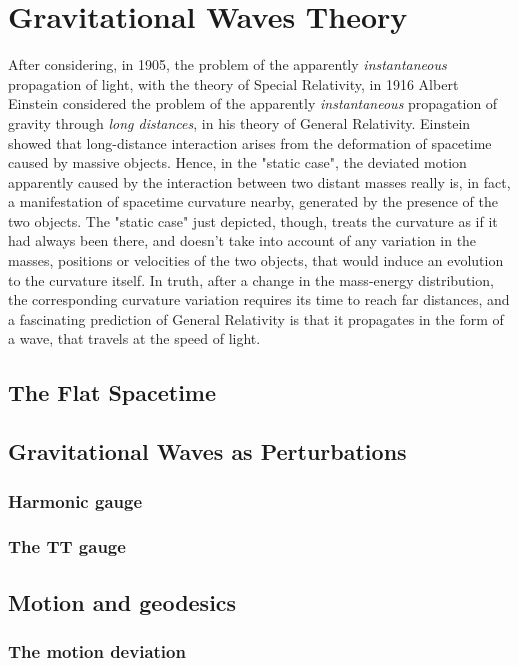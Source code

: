 \chapter{Gravitational Waves Theory}
After considering, in 1905, the problem of the apparently \textit{instantaneous} propagation of light, with the theory of Special Relativity, in 1916 Albert Einstein considered the problem of the apparently \textit{instantaneous} propagation of gravity through \textit{long distances}, in his theory of General Relativity.
Einstein showed that long-distance interaction arises from the deformation of spacetime caused by massive objects.
Hence, in the "static case", the deviated motion apparently caused by the interaction between two distant masses really is, in fact, a manifestation of spacetime curvature nearby, generated by the presence of the two objects.
The "static case" just depicted, though, treats the curvature as if it had always been there, and doesn't take into account of any variation in the masses, positions or velocities of the two objects, that would induce an evolution to the curvature itself.
In truth, after a change in the mass-energy distribution, the corresponding curvature variation requires its time to reach far distances, and a fascinating prediction of General Relativity is that it propagates in the form of a wave, that travels at the speed of light.



\section{The Flat Spacetime}

\section{Gravitational Waves as Perturbations}
\subsection{Harmonic gauge}
\subsection{The TT gauge}


\section{Motion and geodesics}
\subsection{The motion deviation}
